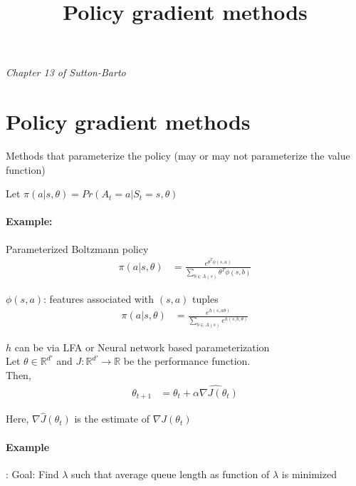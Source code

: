\documentclass{article}
\title{Policy gradient methods}
\begin{document}
\maketitle

\textit{Chapter 13 of Sutton-Barto}

\section{Policy gradient methods}
\label{sec:policy-grad-meth}

Methods that parameterize the policy (may or may not parameterize the value function)

Let $\pi(a|s, \theta) = Pr(A_t = a | S_t = s, \theta)$

\paragraph{Example:} Parameterized Boltzmann policy\\

\begin{align*}
\pi(a | s, \theta) &= \frac{e^{\theta^T \phi(s, a)}}{\sum_{b \in A(s)} \theta^T\phi(s, b)}
\end{align*}

$\phi(s, a)$: features associated with $(s, a)$ tuples \\

\begin{align*}
\pi(a | s, \theta) &= \frac{e^{h(s, a \theta)}}{\sum_{b \in A(s)}e^{h(s, b, \theta)}}
\end{align*}

$h$ can be via LFA or Neural network based parameterization \\

Let $\theta \in \mathbb{R}^{d'}$ and $J: \mathbb{R}^{d'} \rightarrow \mathbb{R}$ be the performance function. \\

Then,
\begin{align*}
  \theta_{t+1} &= \theta_t + \hat{\alpha \nabla J(\theta_t)}
\end{align*}

Here, $\nabla \hat{J}(\theta_t)$ is the estimate of $\nabla J(\theta_t)$

\paragraph{Example}:
Goal: Find $\lambda$ such that average queue length as function of $\lambda$ is minimized
\end{document}
